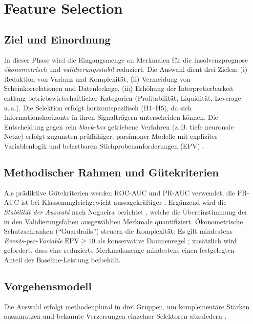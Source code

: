 \chapter{Feature Selection}
\label{chap:feature-selection}

\section{Ziel und Einordnung}
In dieser Phase wird die Eingangsmenge an Merkmalen für die Insolvenzprognose \emph{ökonometrisch} und \emph{validierungsstabil} reduziert. Die Auswahl dient drei Zielen: (i) Reduktion von Varianz und Komplexität, (ii) Vermeidung von Scheinkorrelationen und Datenleckage, (iii) Erhöhung der Interpretierbarkeit entlang betriebswirtschaftlicher Kategorien (Profitabilität, Liquidität, Leverage u.\,a.). Die Selektion erfolgt horizontspezifisch ($\mathrm{H1}$–$\mathrm{H5}$), da sich Informationshorizonte in ihren Signalträgern unterscheiden können. Die Entscheidung gegen rein \emph{black-box} getriebene Verfahren (z.\,B. tiefe neuronale Netze) erfolgt zugunsten prüffähiger, parsimoner Modelle mit expliziter Variablenlogik und belastbaren Stichprobenanforderungen (EPV) \parencite{rudin2019stop,wooldridge2010econometric}.

\section{Methodischer Rahmen und Gütekriterien}
Als prädiktive Gütekriterien werden ROC-AUC und PR-AUC verwendet; die PR-AUC ist bei Klassenungleichgewicht aussagekräftiger \parencite{saito2015precision}. Ergänzend wird die \emph{Stabilität der Auswahl} nach Nogueira berichtet \parencite{nogueira2018stability}, welche die Übereinstimmung der in den Validierungsfalten ausgewählten Merkmale quantifiziert. Ökonometrische Schutzschranken (``Guardrails'') steuern die Komplexität: Es gilt mindestens \emph{Events-per-Variable} $\mathrm{EPV}\geq10$ als konservative Daumenregel \parencite{peduzzi1996epv,steyerberg2019clinical}; zusätzlich wird gefordert, dass eine reduzierte Merkmalsmenge mindestens einen festgelegten Anteil der Baseline-Leistung beibehält.

\section{Vorgehensmodell}
Die Auswahl erfolgt methodenplural in drei Gruppen, um komplementäre Stärken auszunutzen und bekannte Verzerrungen einzelner Selektoren abzufedern \parencite{guyon2003introduction,meinshausen2010stability}.

